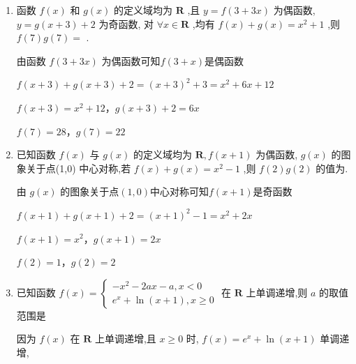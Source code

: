 \begin{enumerate}
\begin{jieda}
        又 $f\left( 1\right)  = 2$ ,故当 $f\left( x\right)  > 2$ ,可得 $x \in  \left( {-1,1}\right)$ ,
        
        又 $f\left( {-x}\right)  = f\left( x\right)$ ,故 $f\left( x\right)  + f\left( {-x}\right)  > 4$ 等价于 $f\left( x\right)  > 2$ ,
        
        故 $x$ 的取值范围为$(-1,1)$.
    \end{jieda}
    \item 函数 $f\left( x\right)$ 和 $g\left( x\right)$ 的定义域均为 $\mathbf{R}$ ,且 $y = f\left( {3 + {3x}}\right)$ 为偶函数, $y = g\left( {x + 3}\right)  + 2$ 为奇函数, 对 $\forall x \in  \mathbf{R}$ ,均有 $f\left( x\right)  + g\left( x\right)  = {x}^{2} + 1$ ,则 $f\left( 7\right) g\left( 7\right)  =$ .
    \begin{jieda}
        由函数 $f\left( {3 + {3x}}\right)$ 为偶函数可知$f(3+x)$是偶函数
        
        $f(x+3) + g(x+3) + 2 = (x+3)^2+3 = x^2+6x+12$

        $f(x+3) = x^2+12$，$g(x+3)+2 = 6x$

        $f(7) = 28$，$g(7) = 22$
    \end{jieda}
    \item 已知函数 $f\left( x\right)$ 与 $g\left( x\right)$ 的定义域均为 $\mathbf{R},f\left( {x + 1}\right)$ 为偶函数, $g\left( x\right)$ 的图象关于点(1,0) 中心对称,若 $f\left( x\right)  + g\left( x\right)  = {x}^{2} - 1$ ,则 $f\left( 2\right) g\left( 2\right)$ 的值为.

    \begin{jieda}
        由 $g\left( x\right)$ 的图象关于点$(1,0)$中心对称可知$f(x+1)$是奇函数
        
        $f(x+1) + g(x+1) + 2 = (x+1)^2-1 = x^2+2x$

        $f(x+1) = x^2$，$g(x+1) = 2x$

        $f(2) = 1$，$g(2) = 2$
    \end{jieda}
    
    \item 已知函数 $f\left( x\right)  = \left\{  \begin{array}{l}  - {x}^{2} - {2ax} - a,x < 0 \\  {{e}}^{x} + \ln \left( {x + 1}\right) ,x \geq  0 \end{array}\right.$ 在 $\mathbf{R}$ 上单调递增,则 $a$ 的取值范围是
    \begin{jieda}
        因为 $f\left( x\right)$ 在 $\mathbf{R}$ 上单调递增,且 $x \geq  0$ 时, $f\left( x\right)  = {{e}}^{x} + \ln \left( {x + 1}\right)$ 单调递增,
        

\end{jieda}
\end{enumerate}
